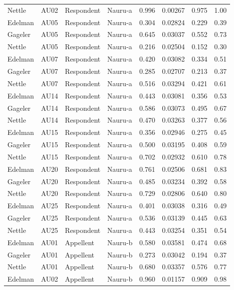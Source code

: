 \documentclass{monashthesis}
\begin{document}
\begin{center}
\begin{longtable}{llllllll}
Nettle & AU02 & Respondent & Nauru-a & 0.996 & 0.00267 & 0.975 & 1.00 \\
Edelman & AU05 & Respondent & Nauru-a & 0.304 & 0.02824 & 0.229 & 0.39 \\
Gageler & AU05 & Respondent & Nauru-a & 0.645 & 0.03037 & 0.552 & 0.73 \\
Nettle & AU05 & Respondent & Nauru-a & 0.216 & 0.02504 & 0.152 & 0.30 \\
Edelman & AU07 & Respondent & Nauru-a & 0.420 & 0.03082 & 0.334 & 0.51 \\
Gageler & AU07 & Respondent & Nauru-a & 0.285 & 0.02707 & 0.213 & 0.37 \\
Nettle & AU07 & Respondent & Nauru-a & 0.516 & 0.03294 & 0.421 & 0.61 \\
Edelman & AU14 & Respondent & Nauru-a & 0.443 & 0.03081 & 0.356 & 0.53 \\
Gageler & AU14 & Respondent & Nauru-a & 0.586 & 0.03073 & 0.495 & 0.67 \\
Nettle & AU14 & Respondent & Nauru-a & 0.470 & 0.03263 & 0.377 & 0.56 \\
Edelman & AU15 & Respondent & Nauru-a & 0.356 & 0.02946 & 0.275 & 0.45 \\
Gageler & AU15 & Respondent & Nauru-a & 0.500 & 0.03195 & 0.408 & 0.59 \\
Nettle & AU15 & Respondent & Nauru-a & 0.702 & 0.02932 & 0.610 & 0.78 \\
Edelman & AU20 & Respondent & Nauru-a & 0.761 & 0.02506 & 0.681 & 0.83 \\
Gageler & AU20 & Respondent & Nauru-a & 0.485 & 0.03234 & 0.392 & 0.58 \\
Nettle & AU20 & Respondent & Nauru-a & 0.729 & 0.02806 & 0.640 & 0.80 \\
Edelman & AU25 & Respondent & Nauru-a & 0.401 & 0.03038 & 0.316 & 0.49 \\
Gageler & AU25 & Respondent & Nauru-a & 0.536 & 0.03139 & 0.445 & 0.63 \\
Nettle & AU25 & Respondent & Nauru-a & 0.443 & 0.03254 & 0.351 & 0.54 \\
Edelman & AU01 & Appellent & Nauru-b & 0.580 & 0.03581 & 0.474 & 0.68 \\
Gageler & AU01 & Appellent & Nauru-b & 0.273 & 0.03042 & 0.194 & 0.37 \\
Nettle & AU01 & Appellent & Nauru-b & 0.680 & 0.03357 & 0.576 & 0.77 \\
Edelman & AU02 & Appellent & Nauru-b & 0.960 & 0.01157 & 0.909 & 0.98 \\

\end{longtable}
\end{center}
\end{document}
